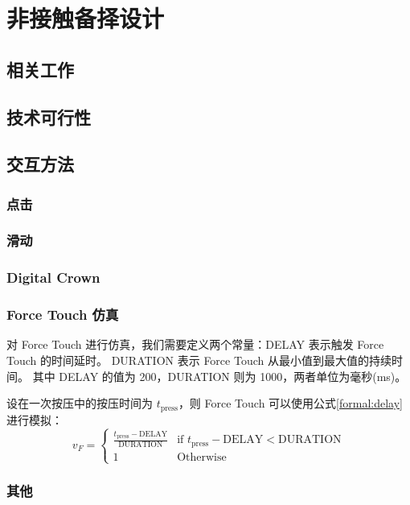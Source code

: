 \chapter{非接触备择设计}

\section{相关工作}

\section{技术可行性}

\section{交互方法}

\subsection{点击}

\subsection{滑动}

\subsection{Digital Crown}

\subsection{Force Touch 仿真}

对 Force Touch 进行仿真，我们需要定义两个常量：DELAY 表示触发 Force Touch 的时间延时。
DURATION 表示 Force Touch 从最小值到最大值的持续时间。
其中 DELAY 的值为 200，DURATION 则为 1000，两者单位为毫秒(ms)。

设在一次按压中的按压时间为 $t_{\text{press}}$，则 Force Touch 可以使用公式\ref{formal:delay}进行模拟：
\begin{equation}
v_{F} =
    \begin{cases}
        \frac{t_{\text{press}}-\text{DELAY}}{\text{DURATION}}
             & \mbox{if $t_{\text{press}}-\text{DELAY}< \text{DURATION}$} \\
        1    & \mbox{Otherwise}
    \end{cases}
\label{formal:delay}
\end{equation}

\subsection{其他}
